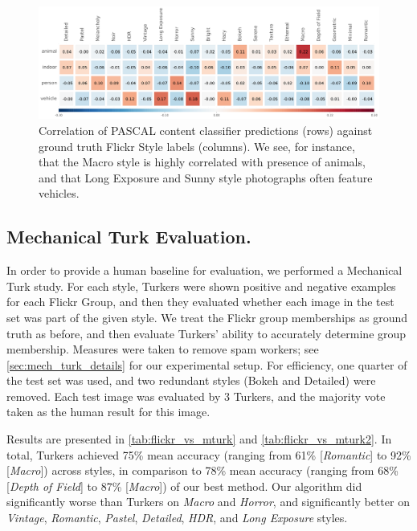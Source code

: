 \begin{figure}[h]
\centering
    \includegraphics[width=\linewidth]{../style/figures/content_correlation2/pascal_on_flickr.pdf}
    \caption[Correlation of PASCAL content classifier predictions with ground truth Flickr Style labels.]{
        Correlation of PASCAL content classifier predictions (rows) against ground truth Flickr Style labels (columns).
        We see, for instance, that the Macro style is highly correlated with presence of animals, and that Long Exposure and Sunny style photographs often feature vehicles.
    }\label{fig:content_correlation}
\end{figure}

\subsection{Mechanical Turk Evaluation.}\label{sec:mech_turk_evaluation}
In order to provide a human baseline for evaluation, we performed a Mechanical Turk study.
For each style, Turkers were shown positive and negative examples for each Flickr Group, and then they evaluated whether each image in the test set was part of the given style.
We treat the Flickr group memberships as ground truth as before, and then evaluate Turkers' ability to accurately determine group membership.
Measures were taken to remove spam workers; see \autoref{sec:mech_turk_details} for our experimental setup.
For efficiency, one quarter of the test set was used, and two redundant styles (Bokeh and Detailed) were removed.
Each test image was evaluated by 3 Turkers, and the majority vote taken as the human result for this image.

Results are presented in \autoref{tab:flickr_vs_mturk} and \autoref{tab:flickr_vs_mturk2}.
In total, Turkers achieved 75\% mean accuracy (ranging from 61\% [\emph{Romantic}] to 92\% [\emph{Macro}]) across styles, in comparison to 78\% mean accuracy (ranging from 68\% [\emph{Depth of Field}] to 87\% [\emph{Macro}]) of our best method.
Our algorithm did significantly worse than Turkers on \emph{Macro} and \emph{Horror}, and significantly better on \emph{Vintage}, \emph{Romantic}, \emph{Pastel}, \emph{Detailed}, \emph{HDR}, and \emph{Long Exposure} styles.


